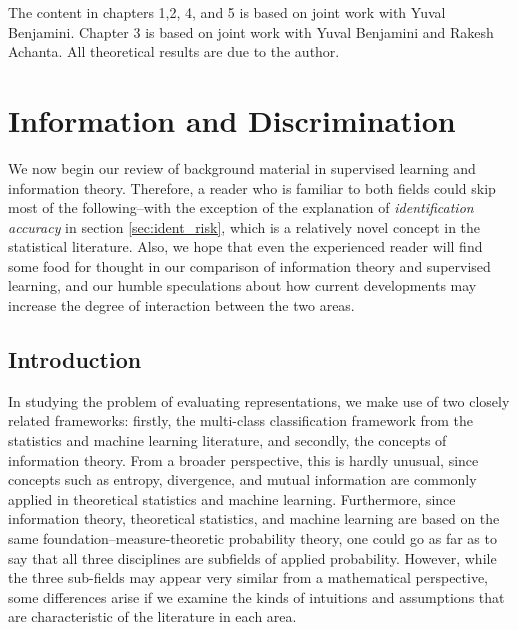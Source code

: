 The content in chapters 1,2, 4, and 5 is based on joint work with
Yuval Benjamini.  Chapter 3 is based on joint work with Yuval
Benjamini and Rakesh Achanta.  All theoretical results are due to the
author.

\section{Information and Discrimination}


We now begin our review of background material in supervised learning
and information theory.  Therefore, a reader who is familiar to both
fields could skip most of the following--with the exception of the
explanation of \emph{identification accuracy} in section
\ref{sec:ident_risk}, which is a relatively novel concept in
the statistical literature.  Also, we hope that even the experienced
reader will find some food for thought in our comparison of
information theory and supervised learning, and our humble
speculations about how current developments may increase the degree of
interaction between the two areas.

\subsection{Introduction}

In studying the problem of evaluating representations, we make use of
two closely related frameworks: firstly, the multi-class
classification framework from the statistics and machine learning
literature, and secondly, the concepts of information theory.  From a
broader perspective, this is hardly unusual, since concepts such as
entropy, divergence, and mutual information are commonly applied in
theoretical statistics and machine learning.  Furthermore, since
information theory, theoretical statistics, and machine learning are
based on the same foundation--measure-theoretic probability theory,
one could go as far as to say that all three disciplines are subfields
of applied probability.  However, while the three sub-fields may
appear very similar from a mathematical perspective, some differences
arise if we examine the kinds of intuitions and assumptions that are
characteristic of the literature in each area.


